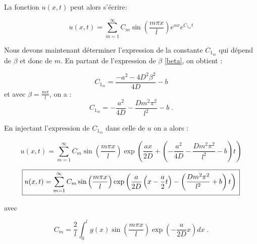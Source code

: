 \documentclass[a4paper, 12pt]{report}
\begin{document}




La fonction $u(x,t)$ peut alors s'écrire:

\begin{equation}
u(x,t) = \sum_{m=1}^{\infty} C_m \sin \left (\frac{m \pi x}{l} \right ) e^{\alpha x} e^{C_{1_m} t}
\end{equation}

Nous devons maintenant déterminer l'expression de la constante $C_{1_m}$ qui dépend de $\beta$ et donc de $m$. En partant de l'expression de $\beta$ \eqref{beta}, on obtient :

\begin{equation}
  C_{1_m}= \frac{-a^2 - 4D^{2}\beta^{2}}{4D}-b
\end{equation}
et avec $\beta = \frac{m \pi}{l}$, on a :
\begin{equation}
  C_{1_m}= - \frac{a^2}{4D} - \frac{D m^2 \pi^2}{l^2}-b\;.
\end{equation}

En injectant l'expression de $C_{1_m}$ dans celle de $u$ on a alors :

\begin{equation}
u(x,t) = \sum_{m=1}^{\infty} C_m \sin \left (\frac{m \pi x}{l} \right ) \exp \left ( \frac{a x}{2D} + \left ( - \frac{a^2}{4D} - \frac{D m^2 \pi^2}{l^2}-b \right ) t \right )
\end{equation}

\begin{equation}
  \boxed{u(x,t) = \sum_{m=1}^{\infty} C_m \sin \left (\frac{m \pi x}{l} \right ) \exp \left ( \frac{a}{2D} \left (x - \frac{a}{2} t \right ) - \left (\frac{D m^2 \pi^2}{l^2}+b \right ) t \right )\\
}
\label{eq:analy_sol}
\end{equation}

avec

\begin{equation}
  \boxed{C_m = \frac{2}{l} \int_0^l g(x) \sin \left (\frac{m \pi x}{l} \right ) \exp \left ( -\frac{a}{2D} x \right ) dx}\;.
\end{equation}
\end{document}
